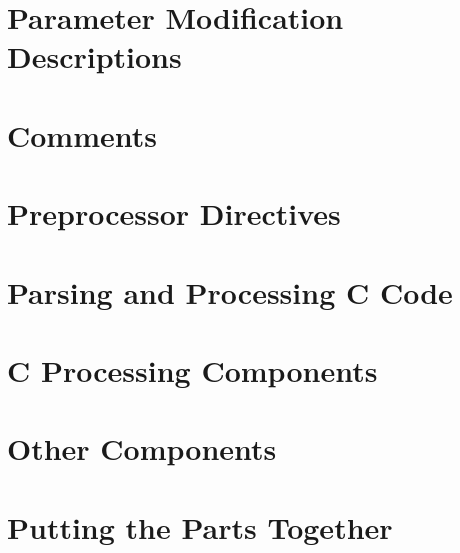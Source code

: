 \documentclass[a4paper]{report}
\begin{document}
\section{Parameter Modification Descriptions}
\label{impl-parmod}


\section{Comments}
\label{impl-comments}


\section{Preprocessor Directives}
\label{impl-preprocessor}


\section{Parsing and Processing C Code}
\label{impl-ccode}


\section{C Processing Components}
\label{impl-ccomps}


\section{Other Components}
\label{impl-ocomps}


\section{Putting the Parts Together}
\label{impl-all}

\end{document}
